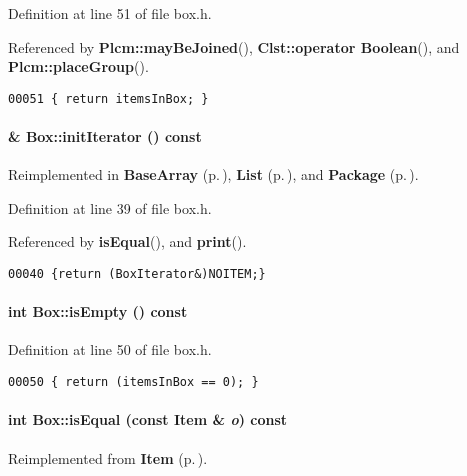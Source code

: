 Definition at line 51 of file box.h.

Referenced by {\bf Plcm::may\-Be\-Joined}(), {\bf Clst::operator Boolean}(), and {\bf Plcm::place\-Group}().\small\begin{verbatim}00051 { return itemsInBox; }
\end{verbatim}\normalsize 
\label{Box_a3}
\paragraph{ \& Box::init\-Iterator () const\hspace{0.3cm}{\tt  [inline, virtual]}}\hfill



Reimplemented in {\bf Base\-Array} {\rm (p.\,\pageref{BaseArray_a5})}, {\bf List} {\rm (p.\,\pageref{List_a8})}, and {\bf Package} {\rm (p.\,\pageref{Package_a6})}.

Definition at line 39 of file box.h.

Referenced by {\bf is\-Equal}(), and {\bf print}().\small\begin{verbatim}00040 {return (BoxIterator&)NOITEM;}
\end{verbatim}\normalsize 
\label{Box_a11}
\paragraph{\setlength{\rightskip}{0pt plus 5cm}int Box::is\-Empty () const\hspace{0.3cm}{\tt  [inline]}}\hfill



Definition at line 50 of file box.h.\small\begin{verbatim}00050 { return (itemsInBox == 0); }
\end{verbatim}\normalsize 
\label{Box_a6}
\paragraph{\setlength{\rightskip}{0pt plus 5cm}int Box::is\-Equal (const {\bf Item} \& {\em o}) const\hspace{0.3cm}{\tt  [virtual]}}\hfill



Reimplemented from {\bf Item} {\rm (p.\,\pageref{Item_a5})}.

